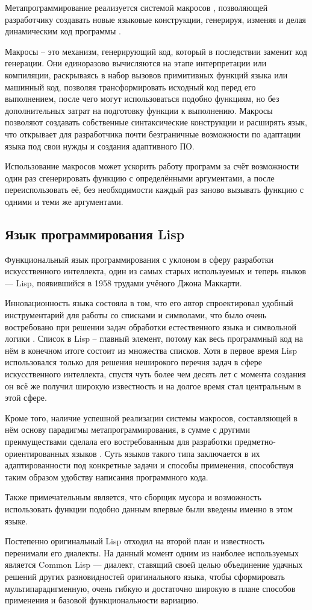 Метапрограммирование реализуется системой макросов \cite{e6}, позволяющей разработчику создавать новые языковые конструкции, генерируя, изменяя и делая динамическим код программы .

Макросы -- это механизм, генерирующий код, который в последствии заменит код генерации. Они единоразово вычисляются на этапе интерпретации или компиляции, раскрываясь в набор вызовов примитивных функций языка или машинный код, позволяя трансформировать исходный код перед его выполнением, после чего могут использоваться подобно функциям, но без дополнительных затрат на подготовку функции к выполнению. Макросы позволяют создавать собственные синтаксические конструкции и расширять язык, что открывает для разработчика почти безграничные возможности по адаптации языка под свои нужды и создания адаптивного ПО.

Использование макросов может ускорить работу программ за счёт возможности один раз сгенерировать функцию с определёнными аргументами, а после переиспользовать её, без необходимости каждый раз заново вызывать функцию с одними и теми же аргументами.

\subsection{Язык программирования Lisp}

Функциональный язык программирования с уклоном в сферу разработки искусственного интеллекта, один из самых старых используемых и теперь языков — Lisp, появившийся в 1958 трудами учёного Джона Маккарти.

Инновационность языка состояла в том, что его автор спроектировал удобный инструментарий для работы со списками и символами, что было очень востребовано при решении задач обработки естественного языка и символьной логики \cite{e1}. Список в Lisp -- главный элемент, потому как весь программный код на нём в конечном итоге состоит из множества списков. Хотя в первое время Lisp использовался только для решения неширокого перечня задач в сфере искусственного интеллекта, спустя чуть более чем десять лет с момента создания он всё же получил широкую известность и на долгое время стал центральным в этой сфере.

Кроме того, наличие успешной реализации системы макросов, составляющей в нём основу парадигмы метапрограммирования, в сумме с другими преимуществами сделала его востребованным для разработки предметно-ориентированных языков \cite{e11}. Суть языков такого типа заключается в их адаптированности под конкретные задачи и способы применения, способствуя таким образом удобству написания программного кода.

Также примечательным является, что сборщик мусора и возможность использовать функции подобно данным впервые были введены именно в этом языке. 

Постепенно оригинальный Lisp отходил на второй план и известность перенимали его диалекты. На данный момент одним из наиболее используемых является Common Lisp — диалект, ставящий своей целью объединение удачных решений других разновидностей оригинального языка, чтобы сформировать мультипарадигменную, очень гибкую и достаточно широкую в плане способов применения и базовой функциональности вариацию.